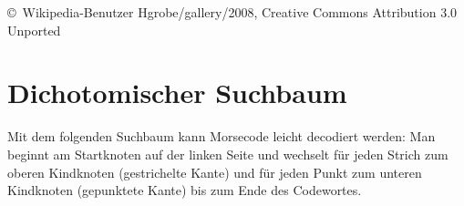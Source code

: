 \documentclass{scrartcl}
\begin{document}
    \vfill
    
    \hfill
    \begin{minipage}[t]{8cm}
      \setlength{\parskip}{.5\baselineskip}
      \scriptsize\color{gray}
      \copyright\ Wikipedia-Benutzer Hgrobe/gallery/2008,
        Creative Commons Attribution 3.0 Unported
    \end{minipage}
    \hfill\strut
    
    \newpage
    
    \section{Dichotomischer Suchbaum}
    
    Mit dem folgenden Suchbaum kann Morsecode leicht decodiert werden:
    Man beginnt am Startknoten auf der linken Seite
    und wechselt für jeden Strich
    zum oberen Kindknoten (gestrichelte Kante)
    und für jeden Punkt zum unteren Kindknoten (gepunktete Kante) bis zum
    Ende des Codewortes. 
    
    \baselineskip
    
\end{document}
